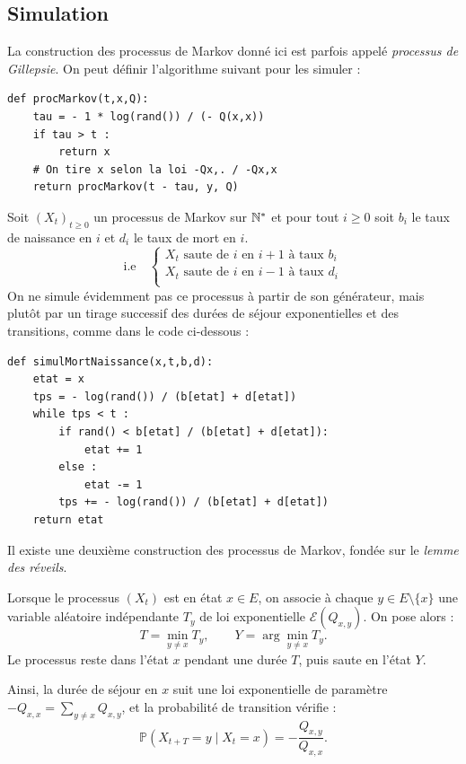 \subsection{Simulation}

\begin{proposition}
    La construction des processus de Markov donné ici est parfois appelé \emph{processus de Gillepsie}. On 
    peut définir l'algorithme suivant pour les simuler : 
\begin{lstlisting}
def procMarkov(t,x,Q): 
    tau = - 1 * log(rand()) / (- Q(x,x))
    if tau > t : 
        return x 
    # On tire x selon la loi -Qx,. / -Qx,x 
    return procMarkov(t - tau, y, Q)
\end{lstlisting}
\end{proposition}

\begin{example}
    Soit $(X_t)_{t \geqslant 0}$ un processus de Markov sur $\mathbb{N}^*$ et pour tout $ i \geqslant 0$
    soit $b_i$ le taux de naissance en $i$ et $ d_i$ le taux de mort en $i$. 
    $$ \text{i.e} \quad 
        \begin{cases}
            X_t \text{ saute de } i \text{ en } i+1 \text{ à taux } b_i \\  
            X_t \text{ saute de } i \text{ en } i-1 \text{ à taux } d_i \\  
        \end{cases}  
    $$ 
    On ne simule évidemment pas ce processus à partir de son générateur, mais plutôt par un tirage
    successif des durées de séjour exponentielles et des transitions, comme dans le code ci-dessous :
\begin{lstlisting}
def simulMortNaissance(x,t,b,d): 
    etat = x 
    tps = - log(rand()) / (b[etat] + d[etat])
    while tps < t : 
        if rand() < b[etat] / (b[etat] + d[etat]): 
            etat += 1
        else : 
            etat -= 1
        tps += - log(rand()) / (b[etat] + d[etat])
    return etat
\end{lstlisting}
\end{example}

\begin{proposition}
    Il existe une deuxième construction des processus de Markov, 
    fondée sur le \emph{lemme des réveils}. 

    Lorsque le processus $(X_t)$ est en état $x \in E$, 
    on associe à chaque $y \in E \setminus \{x\}$ une variable aléatoire indépendante 
    $T_y$ de loi exponentielle $\mathcal{E}(Q_{x,y})$.  
    On pose alors :
    $$
        T = \min_{y \neq x} T_y, \qquad
        Y = \arg\min_{y \neq x} T_y.
    $$
    Le processus reste dans l’état $x$ pendant une durée $T$, 
    puis saute en l’état $Y$.

    Ainsi, la durée de séjour en $x$ suit une loi exponentielle 
    de paramètre $-Q_{x,x} = \sum_{y \neq x} Q_{x,y}$, 
    et la probabilité de transition vérifie :
    $$
        \mathbb{P}(X_{t+T} = y \mid X_t = x) 
        = -\frac{Q_{x,y}}{Q_{x,x}}.
    $$
\end{proposition}

